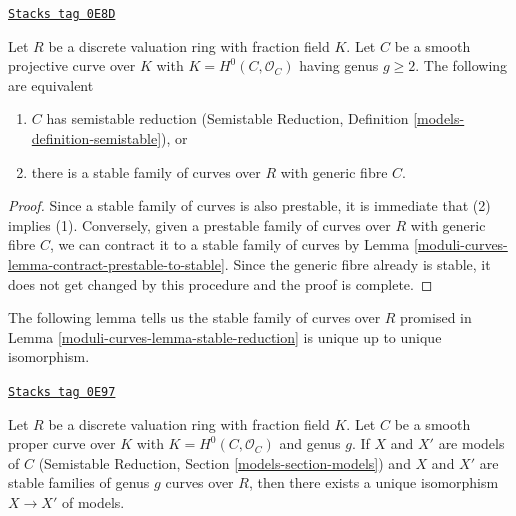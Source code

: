 \begin{lemma}
\label{moduli-curves-lemma-stable-reduction}
\href{https://stacks.math.columbia.edu/tag/0E8D}{\texttt{Stacks tag 0E8D}}

Let $R$ be a discrete valuation ring with fraction field $K$.
Let $C$ be a smooth projective curve over $K$ with
$K = H^0(C, \mathcal{O}_C)$ having genus $g \geq 2$.
The following are equivalent
\begin{enumerate}
\item $C$ has semistable reduction
(Semistable Reduction, Definition \ref{models-definition-semistable}), or
\item there is a stable family of curves over $R$ with generic fibre $C$.
\end{enumerate}
\end{lemma}

\begin{proof}
Since a stable family of curves is also prestable, it is immediate that
(2) implies (1). Conversely, given a prestable family of curves over $R$
with generic fibre $C$, we can contract it to a stable family of curves
by Lemma \ref{moduli-curves-lemma-contract-prestable-to-stable}. Since the generic
fibre already is stable, it does not get changed by this procedure and
the proof is complete.
\end{proof}

The following lemma tells us the stable family of curves over $R$
promised in Lemma \ref{moduli-curves-lemma-stable-reduction}
is unique up to unique isomorphism.

\begin{lemma}
\label{moduli-curves-lemma-unique-stable-model}
\href{https://stacks.math.columbia.edu/tag/0E97}{\texttt{Stacks tag 0E97}}

Let $R$ be a discrete valuation ring with fraction field $K$.
Let $C$ be a smooth proper curve over $K$
with $K = H^0(C, \mathcal{O}_C)$ and genus $g$.
If $X$ and $X'$ are models of $C$
(Semistable Reduction, Section \ref{models-section-models})
and $X$ and $X'$ are stable families of genus $g$ curves over $R$,
then there exists a unique isomorphism $X \to X'$ of models.
\end{lemma}

